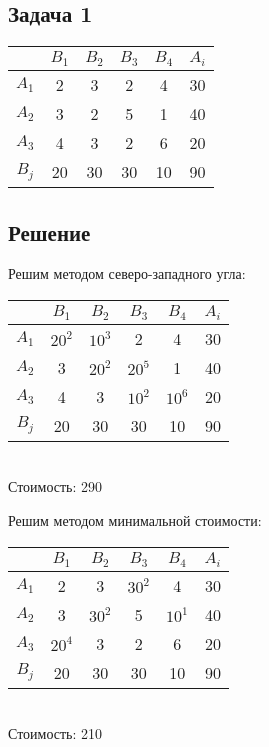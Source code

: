 \documentclass[12pt]{article}
\begin{document}
\subsection*{Задача 1}

\begin{table}[h!]
\begin{center}
\begin{tabular}{|c|c|c|c|c|c|}
\hline
           & $B_1$ & $B_2$ & $B_3$ & $B_4$ & $A_i$	\\
\hline
 $A_1$ & 2 & 3 & 2 & 4 & 30	\\
\hline
 $A_2$ & 3 & 2 & 5 & 1 & 40	\\
\hline
 $A_3$ & 4 & 3 & 2 & 6 & 20	\\ 
\hline
 $B_j$ & 20 & 30 & 30 & 10 & 90	\\
\hline
\end{tabular}
\end{center}
\end{table} 
\subsection*{Решение}
Решим методом северо-западного угла:
\begin{table}[h!]
\begin{center}
\begin{tabular}{|c|c|c|c|c|c|}
\hline
           & $B_1$ & $B_2$ & $B_3$ & $B_4$ & $A_i$	\\
\hline
 $A_1$ & $20^2$ & $10^3$  & 2 & 4 & 30	\\
\hline
 $A_2$ & 3 & $20^2$  & $20^5$  & 1 & 40	\\
\hline
 $A_3$ & 4 & 3 & $10^2$  & $10^6$  & 20	\\ 
\hline
 $B_j$ & 20 & 30 & 30 & 10 & 90	\\
\hline
\end{tabular}\\

Стоимость: 290
\end{center}
\end{table} 

Решим методом минимальной стоимости:
\begin{table}[h!]
\begin{center}
\begin{tabular}{|c|c|c|c|c|c|}
\hline
           & $B_1$ & $B_2$ & $B_3$ & $B_4$ & $A_i$	\\
\hline
 $A_1$ & 2 & 3 & $30^2$ & 4 & 30	\\
\hline
 $A_2$ & 3 & $30^2$ & 5 & $10^1$ & 40	\\
\hline
 $A_3$ & $20^4$ & 3 & 2 & 6 & 20	\\ 
\hline
 $B_j$ & 20 & 30 & 30 & 10 & 90	\\
\hline
\end{tabular}\\
Стоимость: 210
\end{center}
\end{table} 
\newpage
\end{document}

